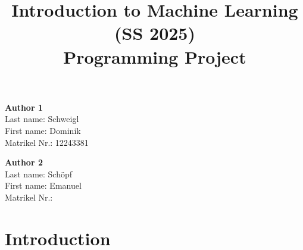 \documentclass[a4, 10 pt, conference]{ieeeconf}  %
\title{\LARGE \bf
Introduction to Machine Learning (SS 2025)\\ Programming Project
\vspace{-3em}
}
\begin{document}
\maketitle
\vspace{-3em}
\thispagestyle{empty}
\pagestyle{empty}

\begin{strip}
  \begin{tcolorbox}[
      size=tight,
      colback=white,
      boxrule=0.2mm,
      left=3mm,right=3mm, top=0mm, bottom=0mm
    ]
    {\begin{multicols}{3}%

        \textbf{Author 1}       \\
        Last name:    Schweigl    \\  %
        First name:   Dominik    \\  %
        Matrikel Nr.: 12243381              \\  %

        \columnbreak

        \textbf{Author 2}       \\
        Last name:    Schöpf          \\  %
        First name:   Emanuel          \\  %
        Matrikel Nr.:               \\  %

        \columnbreak


      \end{multicols}}
  \end{tcolorbox}
\end{strip}


\section{Introduction}
\label{sec:intro}
\end{document}
